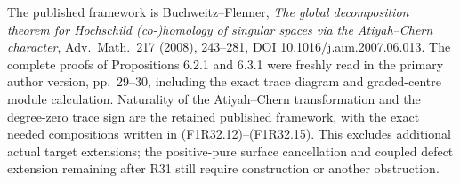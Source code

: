 The published framework is
Buchweitz--Flenner, \emph{The global
decomposition theorem for Hochschild
(co-)homology of singular spaces via
the Atiyah--Chern character},
Adv.~Math.~217 (2008), 243--281,
DOI 10.1016/j.aim.2007.06.013.
The complete proofs of Propositions
6.2.1 and 6.3.1 were freshly read
in the primary author version,
pp.~29--30, including the exact
trace diagram and graded-centre
module calculation. Naturality of
the Atiyah--Chern transformation and
the degree-zero trace sign are the
retained published framework, with
the exact needed compositions
written in (F1R32.12)--(F1R32.15).
This excludes additional actual
target extensions; the positive-pure
surface cancellation and coupled
defect extension remaining after
R31 still require construction or
another obstruction.
